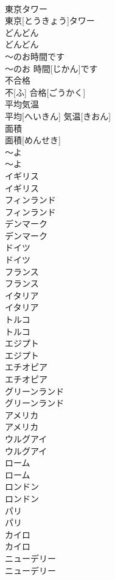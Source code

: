 \documentclass[8pt]{extreport}
\begin{document}
\begin{CJK}{UTF8}{min}
\\	東京タワー	
\\	東京[とうきょう]タワー		
\\	どんどん	
\\	どんどん		
\\	〜のお時間です	
\\	〜のお 時間[じかん]です		
\\	不合格	
\\	不[ふ] 合格[ごうかく]		
\\	平均気温	
\\	平均[へいきん] 気温[きおん]		
\\	面積	
\\	面積[めんせき]		
\\	〜よ	
\\	〜よ		
\\	イギリス	
\\	イギリス		
\\	フィンランド	
\\	フィンランド		
\\	デンマーク	
\\	デンマーク		
\\	ドイツ	
\\	ドイツ		
\\	フランス	
\\	フランス		
\\	イタリア	
\\	イタリア		
\\	トルコ	
\\	トルコ		
\\	エジプト	
\\	エジプト		
\\	エチオピア	
\\	エチオピア		
\\	グリーンランド	
\\	グリーンランド		
\\	アメリカ	
\\	アメリカ		
\\	ウルグアイ	
\\	ウルグアイ		
\\	ローム	
\\	ローム		
\\	ロンドン	
\\	ロンドン		
\\	パリ	
\\	パリ		
\\	カイロ	
\\	カイロ		
\\	ニューデリー	
\\	ニューデリー		

\end{CJK}
\end{document}
